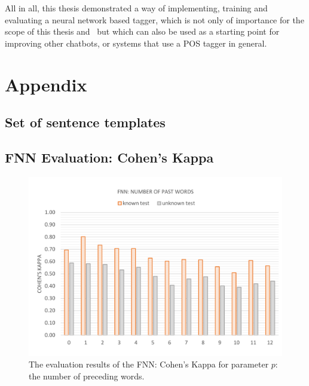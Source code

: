 All in all, this thesis demonstrated a way of implementing, training and evaluating a neural network based tagger, which is not only of importance for the scope of this thesis and \Alex\ but which can also be used as a starting point for improving other chatbots, or systems that use a POS tagger in general.




\appendix
\chapter{Appendix}\label{c.appendix}

\section{Set of sentence templates}\label{c.appendix.sentencetemplates}


\newpage

\section{FNN Evaluation: Cohen's Kappa}\label{c.appendix.kappa.fnn}
\vspace{-13mm}
\begin{figure}[H]
	\centering\includegraphics[width=\textwidth]{images/evaluation_fnn_p_k}
	\caption[FNN Evaluation: Number of Past Words]{The evaluation results of the FNN: Cohen's Kappa for parameter $p$: the number of preceding words.}
	\label{f.evaluation.fnn.p.k}
\end{figure}

